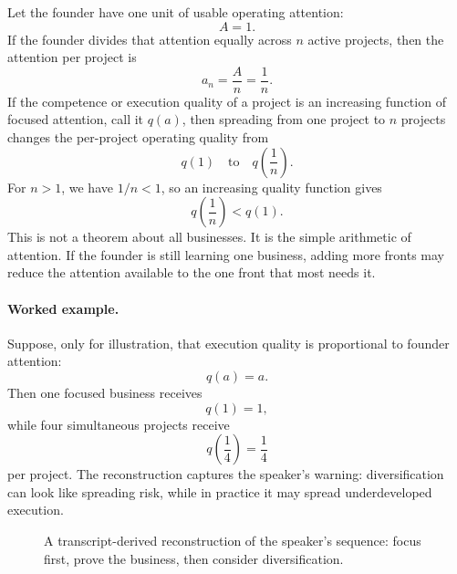 Let the founder have one unit of usable operating attention:
\begin{equation}
A = 1.
\end{equation}
If the founder divides that attention equally across \(n\) active projects, then the attention per project is
\begin{equation}
a_n = \frac{A}{n} = \frac{1}{n}.
\end{equation}
If the competence or execution quality of a project is an increasing function of focused attention, call it \(q(a)\), then spreading from one project to \(n\) projects changes the per-project operating quality from
\begin{equation}
q(1)
\quad \text{to} \quad
q\!\left(\frac{1}{n}\right).
\end{equation}
For \(n>1\), we have \(1/n < 1\), so an increasing quality function gives
\begin{equation}
q\!\left(\frac{1}{n}\right) < q(1).
\end{equation}
This is not a theorem about all businesses. It is the simple arithmetic of attention. If the founder is still learning one business, adding more fronts may reduce the attention available to the one front that most needs it.

\paragraph{Worked example.}
Suppose, only for illustration, that execution quality is proportional to founder attention:
\begin{equation}
q(a) = a.
\end{equation}
Then one focused business receives
\begin{equation}
q(1) = 1,
\end{equation}
while four simultaneous projects receive
\begin{equation}
q\!\left(\frac{1}{4}\right) = \frac{1}{4}
\end{equation}
per project. The reconstruction captures the speaker's warning: diversification can look like spreading risk, while in practice it may spread underdeveloped execution.

\begin{figure}
\centering
{}
\caption{A transcript-derived reconstruction of the speaker's sequence: focus first, prove the business, then consider diversification.}
\end{figure}

